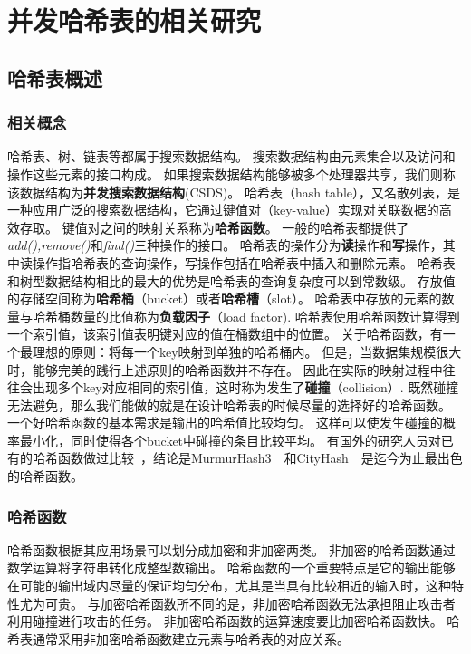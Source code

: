 \chapter{并发哈希表的相关研究}


\section{哈希表概述}

\subsection{相关概念}

哈希表、树、链表等都属于搜索数据结构。
搜索数据结构由元素集合以及访问和操作这些元素的接口构成。
如果搜索数据结构能够被多个处理器共享，我们则称该数据结构为\textbf{并发搜索数据结构}(CSDS)。
哈希表（hash table），又名散列表，是一种应用广泛的搜索数据结构，它通过键值对（key-value）实现对关联数据的高效存取。
键值对之间的映射关系称为\textbf{哈希函数}。
一般的哈希表都提供了\textit{add(),remove()}和\textit{find()}三种操作的接口。
哈希表的操作分为\textbf{读}操作和\textbf{写}操作，其中读操作指哈希表的查询操作，写操作包括在哈希表中插入和删除元素。
哈希表和树型数据结构相比的最大的优势是哈希表的查询复杂度可以到常数级。
存放值的存储空间称为\textbf{哈希桶}（bucket）或者\textbf{哈希槽}（slot）。
哈希表中存放的元素的数量与哈希桶数量的比值称为\textbf{负载因子}（load factor).
哈希表使用哈希函数计算得到一个索引值，该索引值表明键对应的值在桶数组中的位置。
关于哈希函数，有一个最理想的原则：将每一个key映射到单独的哈希桶内。
但是，当数据集规模很大时，能够完美的践行上述原则的哈希函数并不存在。
因此在实际的映射过程中往往会出现多个key对应相同的索引值，这时称为发生了\textbf{碰撞}（collision）.
既然碰撞无法避免，那么我们能做的就是在设计哈希表的时候尽量的选择好的哈希函数。
一个好哈希函数的基本需求是输出的哈希值比较均匀。
这样可以使发生碰撞的概率最小化，同时使得各个bucket中碰撞的条目比较平均。
有国外的研究人员对已有的哈希函数做过比较~\cite{Josh2012}，结论是MurmurHash3~\cite{Murmurhash}~和CityHash~\cite{cityhash}~是迄今为止最出色的哈希函数。

\subsection{哈希函数}
哈希函数根据其应用场景可以划分成加密和非加密两类。
非加密的哈希函数通过数学运算将字符串转化成整型数输出。
哈希函数的一个重要特点是它的输出能够在可能的输出域内尽量的保证均匀分布，尤其是当具有比较相近的输入时，这种特性尤为可贵。
与加密哈希函数所不同的是，非加密哈希函数无法承担阻止攻击者利用碰撞进行攻击的任务。
非加密哈希函数的运算速度要比加密哈希函数快。
哈希表通常采用非加密哈希函数建立元素与哈希表的对应关系。

